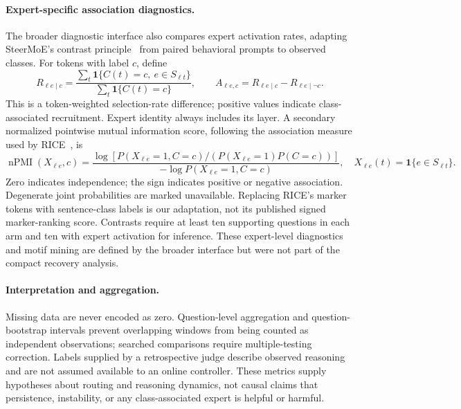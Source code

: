 \paragraph{Expert-specific association diagnostics.}
The broader diagnostic interface also compares expert activation rates, adapting
SteerMoE's contrast principle~\cite{newmetrics_fayyaz2026} from paired behavioral
prompts to observed classes. For tokens with label $c$, define
\begin{equation}
 R_{\ell e\mid c}=\frac{\sum_t\mathbf{1}\{C(t)=c,\ e\in S_{\ell t}\}}
                          {\sum_t\mathbf{1}\{C(t)=c\}},
 \qquad A_{\ell e,c}=R_{\ell e\mid c}-R_{\ell e\mid\neg c}.
 \label{eq:new-activation-contrast}
\end{equation}
This is a token-weighted selection-rate difference; positive values indicate
class-associated recruitment. Expert identity always includes its layer.
A secondary normalized pointwise mutual information score, following the
association measure used by RICE~\cite{newmetrics_wang2025}, is
\begin{equation}
 \operatorname{nPMI}(X_{\ell e},c)=
 \frac{\log\!\left[P(X_{\ell e}=1,C=c)/
                (P(X_{\ell e}=1)P(C=c))\right]}
      {-\log P(X_{\ell e}=1,C=c)},
 \quad X_{\ell e}(t)=\mathbf{1}\{e\in S_{\ell t}\}.
 \label{eq:new-npmi}
\end{equation}
Zero indicates independence; the sign indicates positive or negative association.
Degenerate joint probabilities are marked unavailable. Replacing RICE's marker
tokens with sentence-class labels is our adaptation, not its published signed
marker-ranking score. Contrasts require at least ten supporting questions in
each arm and ten with expert activation for inference. These expert-level
diagnostics and motif mining are defined by the broader interface but were not
part of the compact recovery analysis.

\paragraph{Interpretation and aggregation.}
Missing data are never encoded as zero. Question-level aggregation and
question-bootstrap intervals prevent overlapping windows from being counted
as independent observations; searched comparisons require multiple-testing
correction. Labels supplied by a retrospective judge describe observed reasoning
and are not assumed available to an online controller. These metrics supply
hypotheses about routing and reasoning dynamics, not causal claims that
persistence, instability, or any class-associated expert is helpful or harmful.
